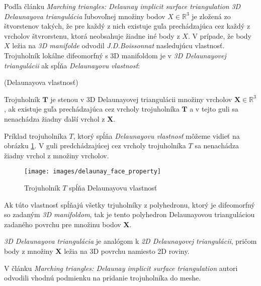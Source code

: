 Podľa článku \textit{Marching triangles: Delaunay implicit surface triangulation} \cite{hilton1997marching} 
\textit{3D Delaunayova triangulácia} ľubovoľnej množiny bodov $X\in \mathbb{R}^3$ je 
zložená zo štvorstenov takých, že pre každý z nich existuje guľa prechádzajúca cez každý z vrcholov 
štvrorstenu, ktorá neobsahuje žiadne iné body z $X$. V prípade, že body $X$ ležia na \textit{3D manifolde} 
odvodil \textit{J.D.Boissonnat} \cite{boissonnat1984geometric} nasledujúcu vlastnosť. Trojuholník
lokálne difeomorfný s 3D manifoldom je v \textit{3D Delaunayovej triangulácii} ak spĺňa 
\textit{Delaunayovu vlastnosť}:

\begin{definition}
    (Delaunayova vlastnosť)

    Trojuholník $\mathbf{T}$ je stenou v 3D Delaunayovej triangulácii množiny vrcholov 
    $\mathbf{X}\in \mathbb{R}^3$, ak existuje guľa prechádzajúca cez vrcholy trojuholníka 
    $\mathbf{T}$ a v tejto guli sa nenachádza žiadny ďalší vrchol z $\mathbf{X}$. 
\end{definition}

Príklad trojuholníka $T$, ktorý spĺňa \textit{Delaunayovu vlastnosť} môžeme vidieť na obrázku 
\ref{obr:delaunay_face_property}. V guli predchádzajúcej cez vrcholy trojuholníka $T$ 
sa nenachádza žiadny vrchol z množiny vrcholov.

\begin{figure}
    \centerline{\texttt{[image: images/delaunay\_face\_property]}}
    \caption[\cite{hilton1996marching} Trojuholník $T$ spĺňa Delaunayovu vlastnosť]{\cite{hilton1996marching} Trojuholník $T$ spĺňa Delaunayovu vlastnosť}
    \label{obr:delaunay_face_property}
\end{figure}

Ak túto vlastnosť spĺňajú všetky trjuholníky z polyhedronu, ktorý je difeomorfný so zadaným 
\textit{3D manifoldom}, tak je tento polyhedron Delaunayovou trianguláciou zadaného povrchu pre 
množinu bodov $\mathbf{X}$.

\textit{3D Delaunayova triangulácia} je analógom k \textit{2D Delaunayovej triangulácii}, pričom
body z množiny $\mathbf{X}$ ležia na 3D povrchu namiesto 2D roviny.

V článku \textit{Marching triangles: Delaunay implicit surface triangulation} \cite{hilton1997marching}
autori odvodili vhodnú podmienku na pridanie trojuholníka do meshe.

